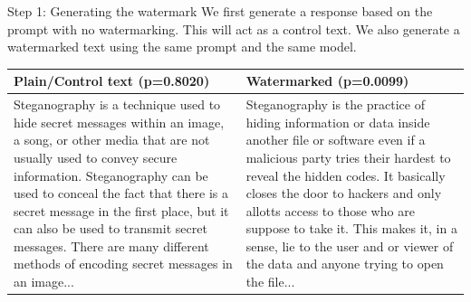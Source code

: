 \begin{frame}[fragile]{Step 1: Generating the watermark}
    We first generate a response based on the prompt with no watermarking. This will act as a control text. We also generate a watermarked text using the same prompt and the same model.

    \scriptsize
    \begin{tabular}{p{} p{}}
        \textbf{Plain/Control text (p=0.8020)}                                                                                                                                                                                                                                                                                                                                                      & \textbf{Watermarked (p=0.0099)}                                                                                                                                                                                                                                                                                                                                                       \\
        \hline
        Steganography is a technique used to hide secret messages within an image, a song, or other media that are not usually used to convey secure information. Steganography can be used to conceal the fact that there is a secret message in the first place, but it can also be used to transmit secret messages. There are many different methods of encoding secret messages in an image... & Steganography is the practice of hiding information or data inside another file or software even if a malicious party tries their hardest to reveal the hidden codes. It basically closes the door to hackers and only allotts access to those who are suppose to take it. This makes it, in a sense, lie to the user and or viewer of the data and anyone trying to open the file...
    \end{tabular}
\end{frame}



